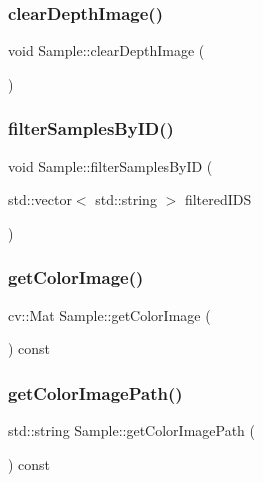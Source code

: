 \mbox{\label{struct_sample_a7e9518b37a26d5d3788f090808a691ba}} 
\subsubsection{\texorpdfstring{clear\+Depth\+Image()}{clearDepthImage()}}
{\footnotesize\ttfamily void Sample\+::clear\+Depth\+Image (\begin{DoxyParamCaption}{ }\end{DoxyParamCaption})}

\mbox{\label{struct_sample_adbfe8d1087bd0ded0edcd572a7beb7e8}} 
\subsubsection{\texorpdfstring{filter\+Samples\+By\+I\+D()}{filterSamplesByID()}}
{\footnotesize\ttfamily void Sample\+::filter\+Samples\+By\+ID (\begin{DoxyParamCaption}\item[{std\+::vector$<$ std\+::string $>$}]{filtered\+I\+DS }\end{DoxyParamCaption})}

\mbox{\label{struct_sample_abf69bbc9b312c22d3ded30d30d1e278f}} 
\subsubsection{\texorpdfstring{get\+Color\+Image()}{getColorImage()}}
{\footnotesize\ttfamily cv\+::\+Mat Sample\+::get\+Color\+Image (\begin{DoxyParamCaption}{ }\end{DoxyParamCaption}) const}

\mbox{\label{struct_sample_a2991d3bc768b12e84c51f52381dad944}} 
\subsubsection{\texorpdfstring{get\+Color\+Image\+Path()}{getColorImagePath()}}
{\footnotesize\ttfamily std\+::string Sample\+::get\+Color\+Image\+Path (\begin{DoxyParamCaption}{ }\end{DoxyParamCaption}) const}

